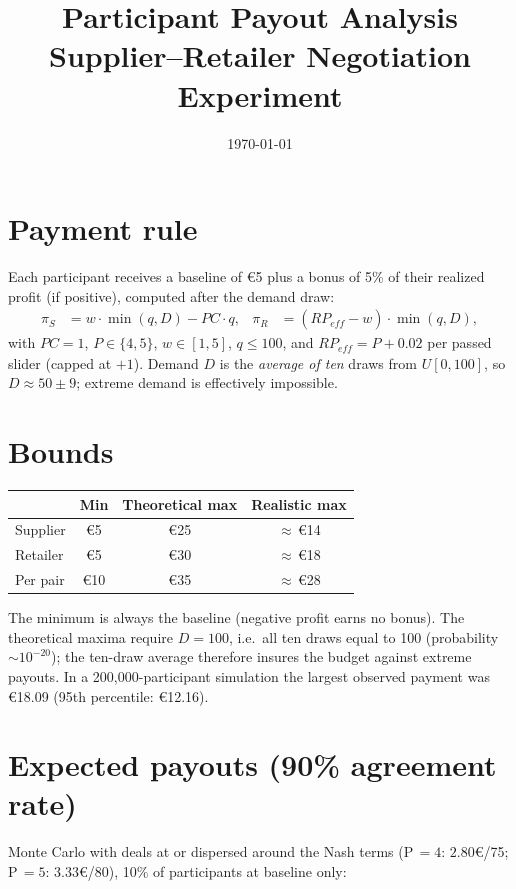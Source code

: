 \documentclass[11pt]{article}
\title{Participant Payout Analysis\\\large Supplier--Retailer Negotiation Experiment}
\date{\today}
\begin{document}
\maketitle

\section*{Payment rule}
Each participant receives a baseline of \euro{5} plus a bonus of 5\% of their
realized profit (if positive), computed after the demand draw:
\begin{align*}
\pi_S &= w \cdot \min(q, D) - PC \cdot q, &
\pi_R &= (RP_{\mathit{eff}} - w) \cdot \min(q, D),
\end{align*}
with $PC=1$, $P \in \{4,5\}$, $w \in [1,5]$, $q \le 100$, and
$RP_{\mathit{eff}} = P + 0.02$ per passed slider (capped at $+1$).
Demand $D$ is the \emph{average of ten} draws from $U[0,100]$, so
$D \approx 50 \pm 9$; extreme demand is effectively impossible.

\section*{Bounds}
\begin{table}[h]\centering
\begin{tabular}{lccc}
\toprule
 & Min & Theoretical max & Realistic max \\
\midrule
Supplier   & \euro{5} & \euro{25} & $\approx$\,\euro{14} \\
Retailer   & \euro{5} & \euro{30} & $\approx$\,\euro{18} \\
Per pair   & \euro{10} & \euro{35} & $\approx$\,\euro{28} \\
\bottomrule
\end{tabular}
\end{table}

The minimum is always the baseline (negative profit earns no bonus). The
theoretical maxima require $D=100$, i.e.\ all ten draws equal to 100
(probability $\sim 10^{-20}$); the ten-draw average therefore insures the
budget against extreme payouts. In a 200{,}000-participant simulation the
largest observed payment was \euro{18.09} (95th percentile: \euro{12.16}).

\section*{Expected payouts (90\% agreement rate)}
Monte Carlo with deals at or dispersed around the Nash terms
(P\,$=4$: $2.80$\euro{}/75; P\,$=5$: $3.33$\euro{}/80), 10\% of
participants at baseline only:
\end{document}
